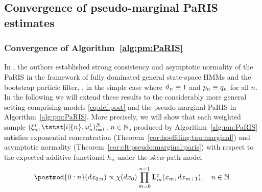 \subsection{Convergence of pseudo-marginal PaRIS estimates}
\label{sec:convergence:results}

\subsubsection{Convergence of Algorithm~\ref{alg:pm:PaRIS}}
\label{sec:convergence:pm:PaRIS}

In \cite{olsson:westerborn:2014b}, the authors established strong consistency and asymptotic normality of the PaRIS in the framework of fully dominated general state-space HMMs and the bootstrap particle filter, \ie, in the simple case where $\vartheta_{n} \equiv 1$ and $\kissforward{n}{n} \equiv \hd{n}$ for all $n$. In the following we will extend these results to the considerably more general setting comprising models \eqref{eq:def:post} and the pseudo-marginal PaRIS in Algorithm~\ref{alg:pm:PaRIS}. More precisely, we will show that each weighted sample $(\epart{n}{i}, \tstat[i]{n}, \ewght{n}{i})_{i = 1}^N$, $n \in \mathbb{N}$, produced by Algorithm~\ref{alg:pm:PaRIS} satisfies exponential concentration (Theorem~\ref{cor:hoeffding:tau:marginal}) and asymptotic normality (Theorem~\ref{cor:clt:pseudo:marginal:paris}) with respect to the expected additive functional $h_n$ under the \emph{skew} path model 
$$
\postmod{0:n}(\rmd x_{0:n}) \propto \chi(\rmd x_0) \prod_{m = 0}^{n - 1} \ukmod{m}(x_m, \rmd x_{m + 1}), \quad n \in \nset. 
$$

